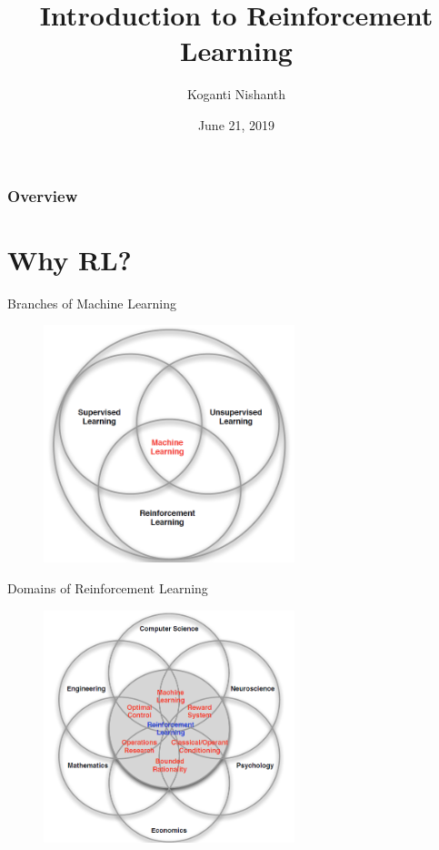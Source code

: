 \documentclass{beamer}
\title[RL Introduction]{Introduction to Reinforcement Learning}
\author{Koganti Nishanth}
\date{June 21, 2019}
\begin{document}
\begin{frame}
    \titlepage
\end{frame}

\begin{frame}
    \frametitle{Overview} 
    \tableofcontents 
\end{frame}

\section{Why RL?}

\begin{frame}{Branches of Machine Learning}
    \begin{figure}
        \centering
        \includegraphics[width=0.65\textwidth]{images/rl_overview}
    \end{figure}
\end{frame}

\begin{frame}{Domains of Reinforcement Learning}
    \begin{figure}
        \centering
        \includegraphics[width=0.65\textwidth]{images/rl_domains}
    \end{figure}    
\end{frame}
\end{document}
